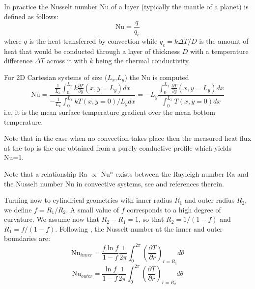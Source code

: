 \begin{itemize}
In practice the Nusselt number Nu of a layer (typically the mantle of a planet) is defined as follows:
\begin{equation}
\text{Nu} = \frac{q}{q_c}
\end{equation} 
where $q$ is the heat transferred by convection while $q_c=k \Delta T /D$ 
is the amount of heat that would be conducted through a layer of
thickness $D$ with a temperature difference $\Delta T$ across it with 
$k$ being the thermal conductivity.

For 2D Cartesian systems of size ($L_x$,$L_y$) the Nu is computed \cite{blbc89}
\[
\text{Nu} = 
 \frac{\frac{1}{L_x}\int_{0}^{L_x} k \frac{\partial T}{\partial y}(x,y=L_y) dx }
{-\frac{1}{L_x}\int_0^{L_x} k T(x,y=0) /L_y dx}
=-L_y \frac{\int_{0}^{L_x} \frac{\partial T}{\partial y}(x,y=L_y) dx }{\int_0^{L_x} T(x,y=0) dx}
\]
i.e. it is the mean surface temperature gradient
over the mean bottom temperature.


Note that in the case when no convection takes place then the measured heat flux at the top is 
the one obtained from a purely conductive profile which yields Nu=1.

Note that a relationship Ra $\propto$ Nu$^\alpha $ exists between the Rayleigh number Ra and the Nusselt number Nu in convective systems, see \cite{wodd09} and references therein. 

Turning now to cylindrical geometries with inner radius $R_1$ and outer radius $R_2$, we define $f=R_1/R_2$. A small value of $f$ corresponds to a high
degree of curvature. We assume now that $R_2-R_1=1$, so that $R_2=1/(1-f)$ and $R_1=f/(1-f)$. 
Following \cite{jarv93}, the Nusselt number at the inner and outer boundaries are:
\begin{equation}
\boxed{
\text{Nu}_{inner} = \frac{f \ln f}{1-f} \frac{1}{2\pi} \int_0^{2\pi} \left( \frac{\partial T}{\partial r} \right)_{r=R_1} d\theta
}
\label{eqNuAnnIn}
\end{equation}
\begin{equation}
\boxed{
\text{Nu}_{outer} = \frac{\ln f}{1-f} \frac{1}{2\pi} \int_0^{2\pi} \left( \frac{\partial T}{\partial r} \right)_{r=R_2} d\theta
}
\label{eqNuAnnOut}
\end{equation}


\end{itemize}
